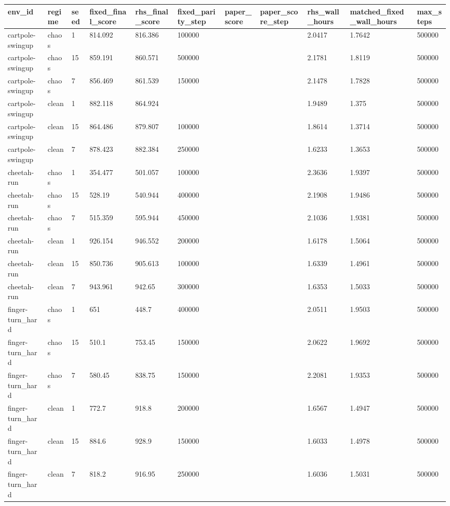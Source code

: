 \begin{tabular}{lllllllllll}
\toprule
env\_id & regime & seed & fixed\_final\_score & rhs\_final\_score & fixed\_parity\_step & paper\_score & paper\_score\_step & rhs\_wall\_hours & matched\_fixed\_wall\_hours & max\_steps \\
\midrule
cartpole-swingup & chaos & 1 & 814.092 & 816.386 & 100000 &  &  & 2.0417 & 1.7642 & 500000 \\
cartpole-swingup & chaos & 15 & 859.191 & 860.571 & 500000 &  &  & 2.1781 & 1.8119 & 500000 \\
cartpole-swingup & chaos & 7 & 856.469 & 861.539 & 150000 &  &  & 2.1478 & 1.7828 & 500000 \\
cartpole-swingup & clean & 1 & 882.118 & 864.924 &  &  &  & 1.9489 & 1.375 & 500000 \\
cartpole-swingup & clean & 15 & 864.486 & 879.807 & 100000 &  &  & 1.8614 & 1.3714 & 500000 \\
cartpole-swingup & clean & 7 & 878.423 & 882.384 & 250000 &  &  & 1.6233 & 1.3653 & 500000 \\
cheetah-run & chaos & 1 & 354.477 & 501.057 & 100000 &  &  & 2.3636 & 1.9397 & 500000 \\
cheetah-run & chaos & 15 & 528.19 & 540.944 & 400000 &  &  & 2.1908 & 1.9486 & 500000 \\
cheetah-run & chaos & 7 & 515.359 & 595.944 & 450000 &  &  & 2.1036 & 1.9381 & 500000 \\
cheetah-run & clean & 1 & 926.154 & 946.552 & 200000 &  &  & 1.6178 & 1.5064 & 500000 \\
cheetah-run & clean & 15 & 850.736 & 905.613 & 100000 &  &  & 1.6339 & 1.4961 & 500000 \\
cheetah-run & clean & 7 & 943.961 & 942.65 & 300000 &  &  & 1.6353 & 1.5033 & 500000 \\
finger-turn\_hard & chaos & 1 & 651 & 448.7 & 400000 &  &  & 2.0511 & 1.9503 & 500000 \\
finger-turn\_hard & chaos & 15 & 510.1 & 753.45 & 150000 &  &  & 2.0622 & 1.9692 & 500000 \\
finger-turn\_hard & chaos & 7 & 580.45 & 838.75 & 150000 &  &  & 2.2081 & 1.9353 & 500000 \\
finger-turn\_hard & clean & 1 & 772.7 & 918.8 & 200000 &  &  & 1.6567 & 1.4947 & 500000 \\
finger-turn\_hard & clean & 15 & 884.6 & 928.9 & 150000 &  &  & 1.6033 & 1.4978 & 500000 \\
finger-turn\_hard & clean & 7 & 818.2 & 916.95 & 250000 &  &  & 1.6036 & 1.5031 & 500000 \\

\end{tabular}

